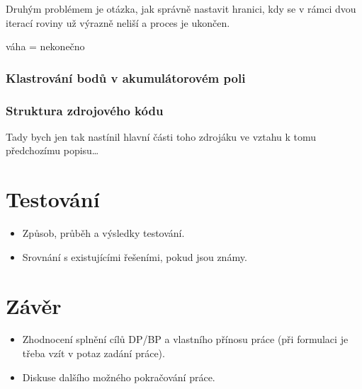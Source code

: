 \documentclass[11pt,twoside,a4paper]{book}
\begin{document}
Druhým problémem je otázka, jak správně nastavit hranici, kdy se v rámci dvou iterací roviny už výrazně neliší a proces je ukončen. 


váha = nekonečno


\subsection{Klastrování bodů v akumulátorovém poli}


\subsection{Struktura zdrojového kódu}

Tady bych jen tak nastínil hlavní části toho zdrojáku ve vztahu k tomu předchozímu popisu\ldots

\chapter{Testování}
\label{chap:test}

\begin{itemize}
 \item Způsob, průběh a výsledky testování.
 \item Srovnání s existujícími řešeními, pokud jsou známy.
\end{itemize} 


\chapter{Závěr}

\begin{itemize}
\item Zhodnocení splnění cílů DP/BP a  vlastního přínosu práce (při formulaci je třeba vzít v potaz zadání práce).
\item Diskuse dalšího možného pokračování práce.
\end{itemize} 


%
\end{document}
